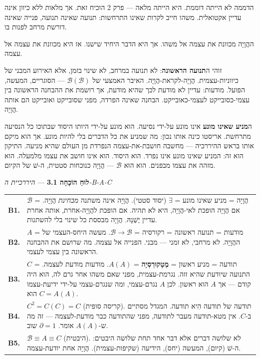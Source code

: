 \documentclass[10pt, openany, oneside]{book}
\renewcommand{\footnotesize}{\fontsize{8.5}{11}\selectfont}
\begin{document}

\noindent הדממה לא הייתה דוממת. היא הייתה מלאה — פרק 2 הוכיח זאת. אך מלאות ללא כיוון אינה עדיין אקטואלית. משהו חייב לקרות שאינו התרחשות: תנועה שאינה תנועה, פנייה שאינה דורשת מרחב לפנות בו.

ההֲוָיָה מכוונת את עצמה אל משהו. אך היא הדבר היחיד שישנו. אז היא מכוונת את עצמה אל עצמה.

זוהי ה\textbf{תנועה הראשונה}: לא תנועה במרחב, לא שינוי בזמן, אלא האירוע המבני של כיווניות-עצמית. הֲוָיָה-לקראת-הֲוָיָה. האיבר האמצעי של $\mathcal{B}(\mathcal{B})$ — הסוגריים, המעשה, הפועל. מודעות: עדיין לא מודעת לכך שהיא מודעת, אך רושמת את ההבחנה הראשונה בין עצמי-כסובייקט לעצמי-כאובייקט. הבחנה שאינה הפרדה, מפני שסובייקט ואובייקט הם אותה הֲוָיָה.

ה\textbf{מניע שאינו מונע} אינו מונע על-ידי נסיעה. הוא מונע על-ידי היותו היסוד שבתוכו כל הנסיעה מתרחשת. אריסטו כינה אותו נכון: מה שמניע את כל הדברים בלי להיות מונע. אך הוא מיקם אותו בראש ההיררכיה — מחשבה חושבת-את-עצמה הנפרדת מן העולם שהיא מניעה. התיקון הוא זה: המניע שאינו מונע אינו נפרד. הוא היסוד. הוא אינו חושב את עצמו מלמעלה. הוא מזהה את עצמו מבפנים. הוא הוּא $\mathcal{B}$ — הֲוָיָה כנוכחות סטטית, ה-שׁ של הקיום.

\vspace{0.5em}

\textbf{לוּחַ הוֹכָחָה 3.1} --- \textit{היררכיית ה-B-A-C}

\vspace{0.5em}

{\footnotesize
\noindent\begin{tabular}{r p{}}
\textbf{B1.} & $\mathcal{B}$ = הֲוָיָה = מניע שאינו מונע = $\exists$ (יסוד סטטי). הֲוָיָה אינה משתנה \textit{מבחינת} הֲוָיָה. אם הֲוָיָה הופכת לאי-הֲוָיָה, היא לא תהיה. אם הופכת להֲוָיָה-אחרת, אותה אחרת עדיין יֶשְׁנָהּ. הֲוָיָה מבססת כל שינוי בלי להשתנות. \\[0.3em]
\textbf{B2.} & $A$ = מודעות = תנועה ראשונה = רקורסיה = $\mathcal{B} \to \mathcal{B}$. מעשה היחס-העצמי של ההֲוָיָה. לא מרחבי, לא זמני — מבני. הפנייה אל עצמה. מה שרושם את ההבחנה הראשונה בין עצמי לעצמי. \\[0.3em]
\textbf{B3.} & $C$ = תודעה = מניע ראשון = \textbf{מֶטָקוּרְסְיָה} = $A(A)$. מודעות מודעת לעצמה. התנועה שיודעת שהיא זזה. נגרמת-עצמית, מפני שאם משהו אחר גרם לה, הוא היה קודם — אך $A$ הוא ראשון. לכן $A$ נגרם-עצמי, ומה שנגרם-עצמי על-ידי ידיעת-עצמו הוא $C = A(A)$. \\[0.3em]
\textbf{B4.} & $C^2 = C(C) = C$ (קריסה סופית). תודעה של תודעה הִיא תודעה. המגדל מסתיים ב-$C$. אין מטא-תודעה מעבר לתודעה, מפני שהתודעה כבר מודעת-לעצמה — זה מה ש-$A(A)$ אומר. $\partial = 1$ שוב. \\[0.3em]
\textbf{B5.} & $\mathcal{B} \equiv A \equiv C$ (היבטית). לא שלושה דברים אלא דבר אחד תחת שלושה היבטים: ה-שׁ (קיום), המעשה (יחס), הידיעה (שקיפות-עצמית). הֲוָיָה אחת יודעת-עצמה. \\[0.3em]
\end{tabular}
}
\end{document}
